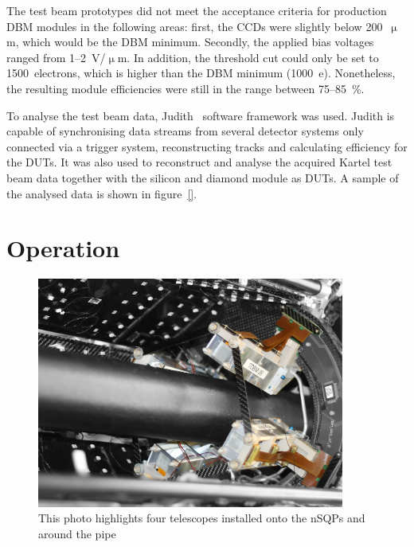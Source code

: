 \documentclass[12pt]{packages/mytustyle}  %
\begin{document}
The test beam prototypes did not meet the acceptance criteria for production DBM modules in the following areas: first, the CCDs were slightly below 200~$\upmu$m, which would be the DBM minimum. Secondly, the applied bias voltages ranged from 1--2~V/$\upmu$m. In addition, the threshold cut could only be set to 1500~electrons, which is higher than the DBM minimum (1000~e). Nonetheless, the resulting module efficiencies were still in the range between 75--85~\%.

To analyse the test beam data, Judith~\cite{} software framework was used. Judith is capable of synchronising data streams from several detector systems only connected via a trigger system, reconstructing tracks and calculating efficiency for the DUTs. It was also used to reconstruct and analyse the acquired Kartel test beam data together with the silicon and diamond module as DUTs. A sample of the analysed data is shown in figure~\ref{}. 



\section{Operation}
\label{sec:operation}
\begin{figure}[!t]
\centering
\includegraphics[width=0.9\textwidth]{pics/DBM-installed-colour1}
\caption{This photo highlights four telescopes installed onto the nSQPs and around the pipe}
\label{fig:dbminatlas}
\end{figure}
\end{document}
